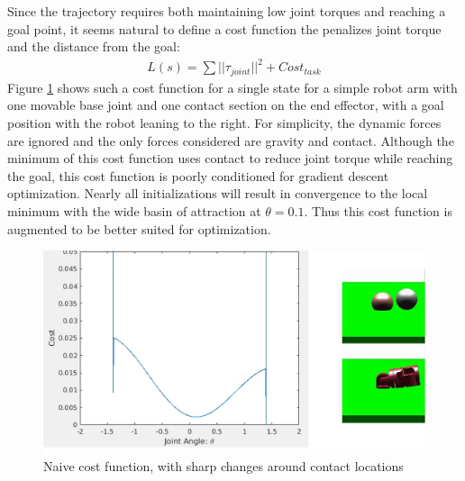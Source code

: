 \documentclass[../thesis.tex]{subfiles}
\begin{document}
Since the trajectory requires both maintaining low joint torques and reaching a goal point, it seems natural to define a cost function the penalizes joint torque and the distance from the goal:
\begin{align}
  L(s) = \sum ||\tau_{joint}||^2 + Cost_{task}
\end{align}
Figure \ref{fig:naive_cost} shows such a cost function for a single state for a simple robot arm with one movable base joint and one contact section on the end effector, with a goal position with the robot leaning to the right.
For simplicity, the dynamic forces are ignored and the only forces considered are gravity and contact.
Although the minimum of this cost function uses contact to reduce joint torque while reaching the goal, this cost function is poorly conditioned for gradient descent optimization.
Nearly all initializations will result in convergence to the local minimum with the wide basin of attraction at $\theta=0.1$.
Thus this cost function is augmented to be better suited for optimization.


\begin{figure}
  \centering
  \includegraphics[width=\linewidth]{./Planning/naive_cost}
  \caption{Naive cost function, with sharp changes around contact locations}
  \label{fig:naive_cost}
\end{figure}
\end{document}
